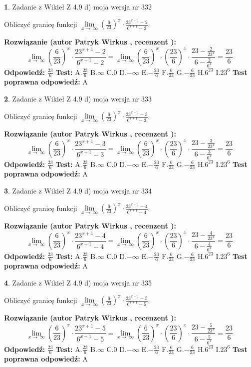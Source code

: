\documentclass[12pt, a4paper]{article}
\theoremstyle{definition} %
\newtheorem{zad}{}
\newcommand{\zadStart}[1]{\begin{zad}#1\newline}
\newcommand{\zadStop}{\end{zad}}
\newcommand{\rozwStart}[2]{\noindent \textbf{Rozwiązanie (autor #1 , recenzent #2): }\newline}
\newcommand{\rozwStop}{\newline}
\newcommand{\odpStart}{\noindent \textbf{Odpowiedź:}\newline}
\newcommand{\odpStop}{\newline}
\newcommand{\testStart}{\noindent \textbf{Test:}\newline}
\newcommand{\testStop}{\newline}
\newcommand{\kluczStart}{\noindent \textbf{Test poprawna odpowiedź:}\newline}
\newcommand{\kluczStop}{\newline}
\begin{document}
\zadStart{Zadanie z Wikieł Z 4.9 d) moja wersja nr 332}


Obliczyć granicę funkcji  $\lim\limits_{x\to\ \infty}(\frac{6}{23})^{x}\cdot\frac{23^{x+1}-2}{6^{x+1}-2}$.
\zadStop
\rozwStart{Patryk Wirkus}{}
$$\lim\limits_{x\to\ \infty}(\frac{6}{23})^{x}\cdot\frac{23^{x+1}-2}{6^{x+1}-2}=\lim\limits_{x\to\ \infty}(\frac{6}{23})^{x}\cdot(\frac{23}{6})^{x} \cdot \frac{23-\frac{2}{23^{x}}}{6-\frac{2}{6^{x}}} = \frac{23}{6}$$
\rozwStop
\odpStart
$\frac{23}{6}$
\odpStop
\testStart
A.$\frac{23}{6}$ B.$\infty$ C.$0$ D.$-\infty$ E.$-\frac{23}{6}$
F.$\frac{6}{23}$ G.$-\frac{6}{23}$
H.$6^{23}$
I.$23^{6}$
\testStop
\kluczStart
A
\kluczStop



\zadStart{Zadanie z Wikieł Z 4.9 d) moja wersja nr 333}


Obliczyć granicę funkcji  $\lim\limits_{x\to\ \infty}(\frac{6}{23})^{x}\cdot\frac{23^{x+1}-3}{6^{x+1}-3}$.
\zadStop
\rozwStart{Patryk Wirkus}{}
$$\lim\limits_{x\to\ \infty}(\frac{6}{23})^{x}\cdot\frac{23^{x+1}-3}{6^{x+1}-3}=\lim\limits_{x\to\ \infty}(\frac{6}{23})^{x}\cdot(\frac{23}{6})^{x} \cdot \frac{23-\frac{3}{23^{x}}}{6-\frac{3}{6^{x}}} = \frac{23}{6}$$
\rozwStop
\odpStart
$\frac{23}{6}$
\odpStop
\testStart
A.$\frac{23}{6}$ B.$\infty$ C.$0$ D.$-\infty$ E.$-\frac{23}{6}$
F.$\frac{6}{23}$ G.$-\frac{6}{23}$
H.$6^{23}$
I.$23^{6}$
\testStop
\kluczStart
A
\kluczStop



\zadStart{Zadanie z Wikieł Z 4.9 d) moja wersja nr 334}


Obliczyć granicę funkcji  $\lim\limits_{x\to\ \infty}(\frac{6}{23})^{x}\cdot\frac{23^{x+1}-4}{6^{x+1}-4}$.
\zadStop
\rozwStart{Patryk Wirkus}{}
$$\lim\limits_{x\to\ \infty}(\frac{6}{23})^{x}\cdot\frac{23^{x+1}-4}{6^{x+1}-4}=\lim\limits_{x\to\ \infty}(\frac{6}{23})^{x}\cdot(\frac{23}{6})^{x} \cdot \frac{23-\frac{4}{23^{x}}}{6-\frac{4}{6^{x}}} = \frac{23}{6}$$
\rozwStop
\odpStart
$\frac{23}{6}$
\odpStop
\testStart
A.$\frac{23}{6}$ B.$\infty$ C.$0$ D.$-\infty$ E.$-\frac{23}{6}$
F.$\frac{6}{23}$ G.$-\frac{6}{23}$
H.$6^{23}$
I.$23^{6}$
\testStop
\kluczStart
A
\kluczStop



\zadStart{Zadanie z Wikieł Z 4.9 d) moja wersja nr 335}


Obliczyć granicę funkcji  $\lim\limits_{x\to\ \infty}(\frac{6}{23})^{x}\cdot\frac{23^{x+1}-5}{6^{x+1}-5}$.
\zadStop
\rozwStart{Patryk Wirkus}{}
$$\lim\limits_{x\to\ \infty}(\frac{6}{23})^{x}\cdot\frac{23^{x+1}-5}{6^{x+1}-5}=\lim\limits_{x\to\ \infty}(\frac{6}{23})^{x}\cdot(\frac{23}{6})^{x} \cdot \frac{23-\frac{5}{23^{x}}}{6-\frac{5}{6^{x}}} = \frac{23}{6}$$
\rozwStop
\odpStart
$\frac{23}{6}$
\odpStop
\testStart
A.$\frac{23}{6}$ B.$\infty$ C.$0$ D.$-\infty$ E.$-\frac{23}{6}$
F.$\frac{6}{23}$ G.$-\frac{6}{23}$
H.$6^{23}$
I.$23^{6}$
\testStop
\kluczStart
A
\kluczStop
\end{document}
